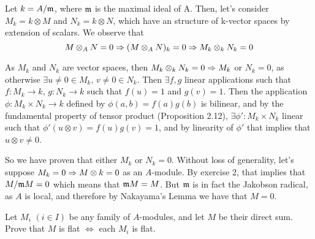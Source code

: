 \begin{sol}
Let $k = A/\mathfrak{m}$, where $\mathfrak{m}$ is the maximal ideal of A. Then, let's consider $M_k = k \otimes M$ and $N_k = k \otimes N$, which have an structure of k-vector spaces by extension of scalars. We observe that
\[
	M \otimes_A N = 0 \Rightarrow (M \otimes_A N)_k = 0 \Rightarrow M_k \otimes_k N_k = 0
\] 

As $M_k$ and $N_k$ are vector spaces, then $M_k \otimes_k N_k = 0 \Rightarrow M_k$ or $N_k = 0$, as otherwise $\exists u \neq 0 \in M_k , \, v \neq 0 \in N_k$. Then $\exists f,g$ linear applications such that $f: M_k \to k$, $g: N_k \to k$ such that $f(u) = 1$ and $g(v) = 1$. Then the application $\phi: M_k \times N_k \to k$ defined by $\phi(a,b) = f(a)g(b)$ is bilinear, and by the fundamental property of tensor product (Proposition 2.12), $\exists \phi': M_k \times N_k$ linear such that $\phi'(u \otimes v) = f(u)g(v) = 1$, and by linearity of $\phi'$ that implies that $u \otimes v \neq 0$.

So we have proven that either $M_k$ or $N_k = 0$. Without loss of generality, let's suppose $M_k = 0 \Rightarrow M \otimes k = 0$ as an $A$-module. By exercise 2, that implies that $M/\mathfrak{m} M = 0$ which means that $\mathfrak{m} M = M$. But $\mathfrak{m}$ is in fact the Jakobson radical, as $A$ is local, and therefore by Nakayama's Lemma we have that $M = 0$. 
\end{sol}

\begin{ex}
	Let $M_i$ $(i \in I)$ be any family of $A$-modules, and let $M$ be their direct sum. Prove that $M$ is flat $\iff$ each $M_i$ is flat.	
\end{ex}

